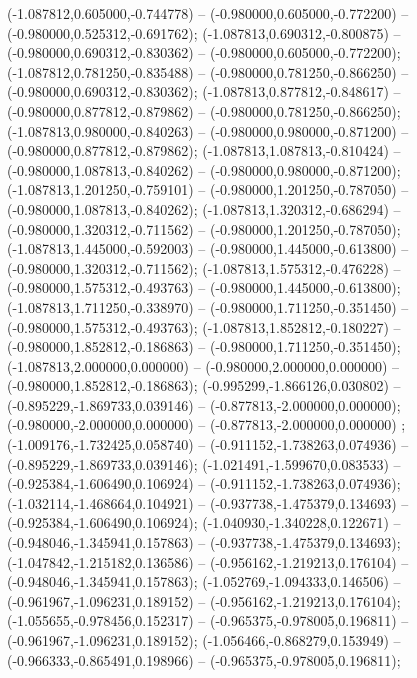  (-1.087812,0.605000,-0.744778) -- (-0.980000,0.605000,-0.772200) -- (-0.980000,0.525312,-0.691762);
 (-1.087813,0.690312,-0.800875) -- (-0.980000,0.690312,-0.830362) -- (-0.980000,0.605000,-0.772200);
 (-1.087812,0.781250,-0.835488) -- (-0.980000,0.781250,-0.866250) -- (-0.980000,0.690312,-0.830362);
 (-1.087813,0.877812,-0.848617) -- (-0.980000,0.877812,-0.879862) -- (-0.980000,0.781250,-0.866250);
 (-1.087813,0.980000,-0.840263) -- (-0.980000,0.980000,-0.871200) -- (-0.980000,0.877812,-0.879862);
 (-1.087813,1.087813,-0.810424) -- (-0.980000,1.087813,-0.840262) -- (-0.980000,0.980000,-0.871200);
 (-1.087813,1.201250,-0.759101) -- (-0.980000,1.201250,-0.787050) -- (-0.980000,1.087813,-0.840262);
 (-1.087813,1.320312,-0.686294) -- (-0.980000,1.320312,-0.711562) -- (-0.980000,1.201250,-0.787050);
 (-1.087813,1.445000,-0.592003) -- (-0.980000,1.445000,-0.613800) -- (-0.980000,1.320312,-0.711562);
 (-1.087813,1.575312,-0.476228) -- (-0.980000,1.575312,-0.493763) -- (-0.980000,1.445000,-0.613800);
 (-1.087813,1.711250,-0.338970) -- (-0.980000,1.711250,-0.351450) -- (-0.980000,1.575312,-0.493763);
 (-1.087813,1.852812,-0.180227) -- (-0.980000,1.852812,-0.186863) -- (-0.980000,1.711250,-0.351450);
 (-1.087813,2.000000,0.000000) -- (-0.980000,2.000000,0.000000) -- (-0.980000,1.852812,-0.186863);
 (-0.995299,-1.866126,0.030802) -- (-0.895229,-1.869733,0.039146) -- (-0.877813,-2.000000,0.000000);
 (-0.980000,-2.000000,0.000000) -- (-0.877813,-2.000000,0.000000) ;
 (-1.009176,-1.732425,0.058740) -- (-0.911152,-1.738263,0.074936) -- (-0.895229,-1.869733,0.039146);
 (-1.021491,-1.599670,0.083533) -- (-0.925384,-1.606490,0.106924) -- (-0.911152,-1.738263,0.074936);
 (-1.032114,-1.468664,0.104921) -- (-0.937738,-1.475379,0.134693) -- (-0.925384,-1.606490,0.106924);
 (-1.040930,-1.340228,0.122671) -- (-0.948046,-1.345941,0.157863) -- (-0.937738,-1.475379,0.134693);
 (-1.047842,-1.215182,0.136586) -- (-0.956162,-1.219213,0.176104) -- (-0.948046,-1.345941,0.157863);
 (-1.052769,-1.094333,0.146506) -- (-0.961967,-1.096231,0.189152) -- (-0.956162,-1.219213,0.176104);
 (-1.055655,-0.978456,0.152317) -- (-0.965375,-0.978005,0.196811) -- (-0.961967,-1.096231,0.189152);
 (-1.056466,-0.868279,0.153949) -- (-0.966333,-0.865491,0.198966) -- (-0.965375,-0.978005,0.196811);
